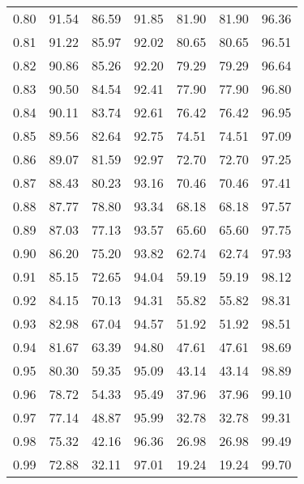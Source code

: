 \begin{tabular}{|c|c|c|c|c|c|c|}
      0.80 &     91.54 &     86.59 &      91.85 &   81.90 &      81.90 &         96.36 \\
      0.81 &     91.22 &     85.97 &      92.02 &   80.65 &      80.65 &         96.51 \\
      0.82 &     90.86 &     85.26 &      92.20 &   79.29 &      79.29 &         96.64 \\
      0.83 &     90.50 &     84.54 &      92.41 &   77.90 &      77.90 &         96.80 \\
      0.84 &     90.11 &     83.74 &      92.61 &   76.42 &      76.42 &         96.95 \\
      0.85 &     89.56 &     82.64 &      92.75 &   74.51 &      74.51 &         97.09 \\
      0.86 &     89.07 &     81.59 &      92.97 &   72.70 &      72.70 &         97.25 \\
      0.87 &     88.43 &     80.23 &      93.16 &   70.46 &      70.46 &         97.41 \\
      0.88 &     87.77 &     78.80 &      93.34 &   68.18 &      68.18 &         97.57 \\
      0.89 &     87.03 &     77.13 &      93.57 &   65.60 &      65.60 &         97.75 \\
      0.90 &     86.20 &     75.20 &      93.82 &   62.74 &      62.74 &         97.93 \\
      0.91 &     85.15 &     72.65 &      94.04 &   59.19 &      59.19 &         98.12 \\
      0.92 &     84.15 &     70.13 &      94.31 &   55.82 &      55.82 &         98.31 \\
      0.93 &     82.98 &     67.04 &      94.57 &   51.92 &      51.92 &         98.51 \\
      0.94 &     81.67 &     63.39 &      94.80 &   47.61 &      47.61 &         98.69 \\
      0.95 &     80.30 &     59.35 &      95.09 &   43.14 &      43.14 &         98.89 \\
      0.96 &     78.72 &     54.33 &      95.49 &   37.96 &      37.96 &         99.10 \\
      0.97 &     77.14 &     48.87 &      95.99 &   32.78 &      32.78 &         99.31 \\
      0.98 &     75.32 &     42.16 &      96.36 &   26.98 &      26.98 &         99.49 \\
      0.99 &     72.88 &     32.11 &      97.01 &   19.24 &      19.24 &         99.70 \\
\bottomrule
\end{tabular}
